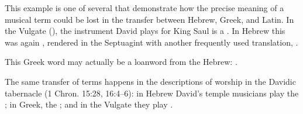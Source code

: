 This example is one of several that demonstrate how the precise meaning of a
musical term could be lost in the transfer between Hebrew, Greek, and Latin.
In the Vulgate (), the instrument David plays for King
Saul is a .
In Hebrew this was again , rendered in the Septuagint with another
frequently used translation, .%
\begin{Footnote}
    This Greek word may actually be a loanword from the Hebrew:
    \autocite[]{Brown:HebrewOTLexicon}.
\end{Footnote}
The same transfer of terms happens in the descriptions of worship in the Davidic
tabernacle (1 Chron. 15:28, 16:4--6): in Hebrew David's temple musicians play
the ; in Greek, the ; and in the Vulgate they
play .

